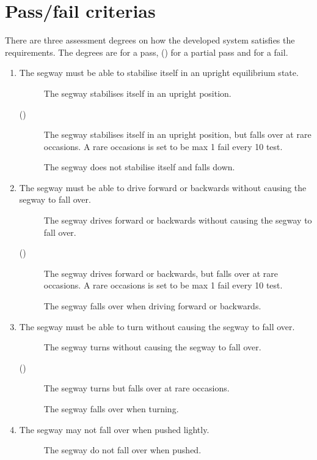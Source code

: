 \section{Pass/fail criterias}
There are three assessment degrees on how the developed system satisfies the requirements. The degrees are  for a pass, () for a partial pass and  for a fail. 
\begin{enumerate}
\item The segway must be able to stabilise itself in an upright equilibrium state.
	\begin{description}
	\item[  ]The segway stabilises itself in an upright position.
	\item[()]The segway stabilises itself in an upright position, but falls over at rare occasions. A rare occasions is set to be max 1 fail every 10 test.
	\item[  \phantom{)}]The segway does not stabilise itself and falls down.
	\end{description}
\item The segway must be able to drive forward or backwards without causing the segway to fall over.
	\begin{description}
	\item[  ]The segway drives forward or backwards without causing the segway to fall over.
	\item[()]The segway drives forward or backwards, but falls over at rare occasions. A rare occasions is set to be max 1 fail every 10 test.
	\item[  \phantom{)}]The segway falls over when driving forward or backwards.
	\end{description}
\item The segway must be able to turn without causing the segway to fall over.
	\begin{description}
	\item[  ]The segway turns without causing the segway to fall over.
	\item[()]The segway turns but falls over at rare occasions.
	\item[  \phantom{)}]The segway falls over when turning.
	\end{description}
\item The segway may not fall over when pushed lightly. 
	\begin{description}
	\item[  ]The segway do not fall over when pushed.

\end{description}
\end{enumerate}

